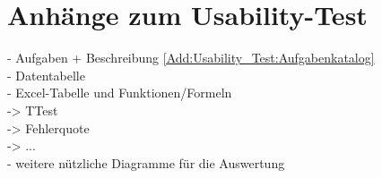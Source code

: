 \chapter{Anhänge zum Usability-Test}

- Aufgaben + Beschreibung \autoref{Add:Usability_Test:Aufgabenkatalog}\\
- Datentabelle \label{fig:Usability_Test:rohe_Daten}\\
- Excel-Tabelle und Funktionen/Formeln \label{fig:Usability-Test:Excel_Berechnungen} \\
-> TTest \\
-> Fehlerquote \\
-> ...\\
- weitere nützliche Diagramme für die Auswertung\\

